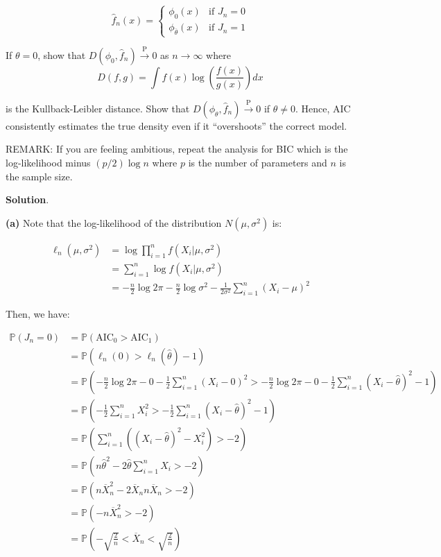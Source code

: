 \[ 
\hat{f}_{n}(x) = 
\begin{cases}
\phi_{0}(x) & \text{if } J_{n} = 0 \\
\phi_{\overline{\theta}}(x) & \text{if } J_{n} = 1
\end{cases}
\]

If \(\theta = 0\), show that
\(D(\phi_{0}, \hat{f}_{n}) \xrightarrow{\text{P}} 0\) as
\(n \rightarrow \infty\) where
\[ 
D(f, g) = \int f(x) \log \left( \frac{f(x)}{g(x)} \right) dx 
\]

is the Kullback-Leibler distance. Show that
\(D(\phi_\theta, \hat{f}_{n}) \xrightarrow{\text{P}} 0\) if
\(\theta \neq 0\). Hence, AIC consistently estimates the true density
even if it ``overshoots'' the correct model.

REMARK: If you are feeling ambitious, repeat the analysis for BIC which
is the log-likelihood minus \((p / 2) \log n\) where \(p\) is the number
of parameters and \(n\) is the sample size.

\textbf{Solution}.

\textbf{(a)} Note that the log-likelihood of the distribution
\(N(\mu, \sigma^{2})\) is:

\begin{align*}
\ell_{n}(\mu, \sigma^{2}) &= \log \prod_{i=1}^{n} f(X_{i} | \mu, \sigma^{2}) \\
&= \sum_{i=1}^{n} \log f(X_{i} | \mu, \sigma^{2}) \\
&= - \frac{n}{2} \log 2\pi - \frac{n}{2} \log \sigma^{2} - \frac{1}{2\sigma^{2}} \sum_{i=1}^{n} (X_{i} - \mu)^{2}
\end{align*}

Then, we have:

\begin{align*}
\mathbb{P}(J_{n} = 0) &= \mathbb{P}(\text{AIC}_{0} > \text{AIC}_{1}) \\
&= \mathbb{P}(\ell_{n}(0) > \ell_{n}(\hat{\theta}) - 1) \\
&= \mathbb{P} \left(-\frac{n}{2} \log 2\pi - 0 - \frac{1}{2} \sum_{i=1}^{n} (X_{i} - 0)^{2} > -\frac{n}{2} \log 2\pi - 0 - \frac{1}{2} \sum_{i=1}^{n} (X_{i} - \hat{\theta})^{2} - 1 \right) \\
&= \mathbb{P}\left( -\frac{1}{2} \sum_{i=1}^{n} X_{i}^{2} > -\frac{1}{2} \sum_{i=1}^{n} (X_{i} - \hat{\theta})^{2} - 1\right) \\
&= \mathbb{P}\left( \sum_{i=1}^{n} \left((X_{i} - \hat{\theta})^{2} - X_{i}^{2} \right) > -2 \right) \\
&= \mathbb{P}\left( n \hat{\theta}^{2} - 2 \hat{\theta} \sum_{i=1}^{n} X_{i} > -2 \right) \\
&= \mathbb{P}\left( n \overline{X}_{n}^{2} - 2 \overline{X}_{n} n \overline{X}_{n} > -2\right) \\
&= \mathbb{P}\left( -n \overline{X}_{n}^{2} > -2 \right) \\
&= \mathbb{P}\left(-\sqrt{\frac{2}{n}} < \overline{X}_{n} < \sqrt{\frac{2}{n}} \right)
\end{align*}

